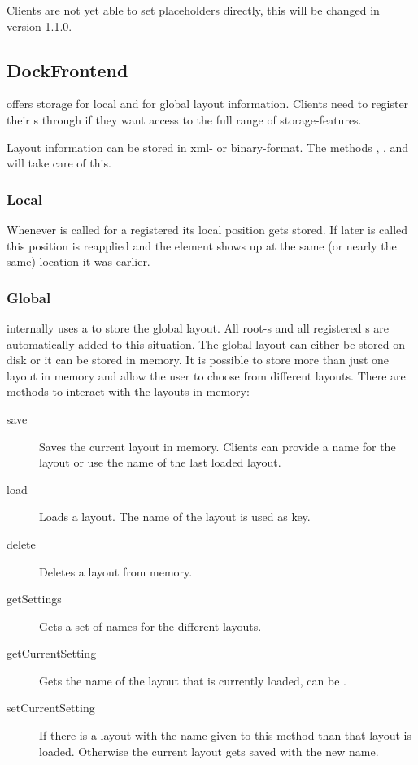 Clients are not yet able to set placeholders directly, this will be changed in version 1.1.0.



\subsection{DockFrontend}
 offers storage for local and for global layout information. Clients need to register their s through  if they want access to the full range of storage-features.

Layout information can be stored in xml- or binary-format. The methods , ,  and  will take care of this.

\subsubsection{Local}
Whenever  is called for a registered  its local position gets stored. If later  is called this position is reapplied and the element shows up at the same (or nearly the same) location it was earlier.

\subsubsection{Global}
 internally uses a  to store the global layout. All root-s and all registered s are automatically added to this situation. The global layout can either be stored on disk or it can be stored in memory. It is possible to store more than just one layout in memory and allow the user to choose from different layouts. There are methods to interact with the layouts in memory:

\begin{description}
 \item[save] Saves the current layout in memory. Clients can provide a name for the layout or use the name of the last loaded layout.
 \item[load] Loads a layout. The name of the layout is used as key.
 \item[delete] Deletes a layout from memory.
 \item[getSettings] Gets a set of names for the different layouts.
 \item[getCurrentSetting] Gets the name of the layout that is currently loaded, can be .
 \item[setCurrentSetting] If there is a layout with the name given to this method than that layout is loaded. Otherwise the current layout gets saved with the new name.
\end{description}

